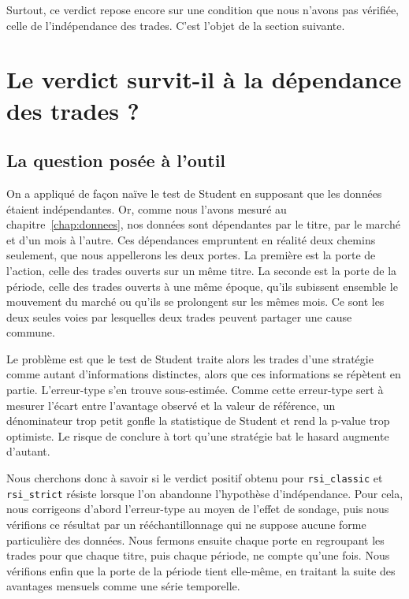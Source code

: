 Surtout, ce verdict repose encore sur une condition que nous n'avons pas
vérifiée, celle de l'indépendance des trades. C'est l'objet de la section
suivante.


\section{Le verdict survit-il à la dépendance des trades ?}
\label{sec:b1-dependance}

\subsection{La question posée à l'outil}
\label{sec:question-dependance}
On a appliqué de façon naïve le test de Student en supposant que
les données étaient indépendantes. Or, comme nous l'avons mesuré
au chapitre~\ref{chap:donnees}, nos données sont dépendantes par le titre,
par le marché et d'un mois à l'autre.
Ces dépendances empruntent en réalité deux chemins seulement, que nous
appellerons les deux portes. La première est la porte de l'action, celle des
trades ouverts sur un même titre. La seconde est la porte de la période,
celle des trades ouverts à une même époque, qu'ils subissent ensemble le
mouvement du marché ou qu'ils se prolongent sur les mêmes mois. Ce sont les
deux seules voies par lesquelles deux trades peuvent partager une cause
commune.

Le problème est que le test de Student traite alors les trades d'une stratégie
comme autant d'informations distinctes, alors que ces informations se
répètent en partie. L'erreur-type s'en trouve sous-estimée. Comme cette
erreur-type sert à mesurer l'écart entre l'avantage observé et la valeur de
référence, un dénominateur trop petit gonfle la statistique de Student et
rend la p-value trop optimiste. Le risque de conclure à tort qu'une stratégie
bat le hasard augmente d'autant.

Nous cherchons donc à savoir si le verdict positif obtenu pour
\texttt{rsi\_classic} et \texttt{rsi\_strict} résiste lorsque l'on abandonne
l'hypothèse d'indépendance. 
Pour cela, nous corrigeons d'abord l'erreur-type
au moyen de l'effet de sondage, puis nous vérifions ce résultat par un
rééchantillonnage qui ne suppose aucune forme particulière des données. Nous
fermons ensuite chaque porte en regroupant les trades pour que chaque titre,
puis chaque période, ne compte qu'une fois. Nous vérifions enfin que la porte
de la période tient elle-même, en traitant la suite des avantages mensuels
comme une série temporelle.

